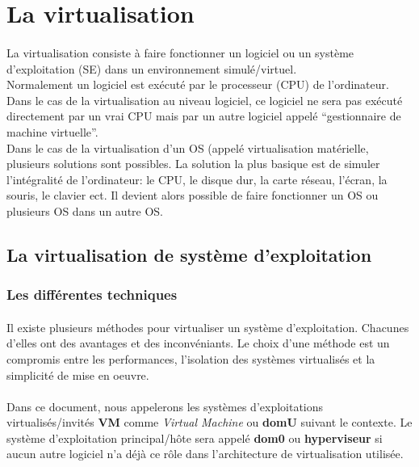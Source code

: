 \section{La virtualisation}
\label{virtualisation}
\paragraph*{}
La virtualisation consiste à faire fonctionner un logiciel ou un système d'exploitation (SE) dans un environnement simulé/virtuel.
\\
Normalement un logiciel est exécuté par le processeur (CPU) de l'ordinateur. Dans le cas de la virtualisation au niveau logiciel,
ce logiciel ne sera pas exécuté directement par un vrai CPU mais par un autre logiciel appelé ``gestionnaire de machine virtuelle''.
\\
Dans le cas de la virtualisation d'un OS (appelé virtualisation matérielle, plusieurs solutions sont possibles. La solution la plus basique est de simuler l'intégralité
de l'ordinateur: le CPU, le disque dur, la carte réseau, l'écran, la souris, le clavier ect.
Il devient alors possible de faire fonctionner un OS ou plusieurs OS dans un autre OS.

\subsection{La virtualisation de système d'exploitation}
\label{virtualisation_mat}
\subsubsection{Les différentes techniques}
\paragraph*{}
Il existe plusieurs méthodes pour virtualiser un système d'exploitation. Chacunes d'elles ont des avantages et des
inconvéniants. Le choix d'une méthode est un compromis entre les performances, l'isolation des systèmes virtualisés
et la simplicité de mise en oeuvre.

\paragraph*{}
Dans ce document, nous appelerons les systèmes d'exploitations virtualisés/invités \textbf{VM} comme \emph{Virtual Machine} ou \textbf{domU} suivant le contexte.
Le système d'exploitation principal/hôte sera appelé \textbf{dom0} ou \textbf{hyperviseur} si aucun autre logiciel n'a déjà ce rôle dans l'architecture de virtualisation
utilisée.

